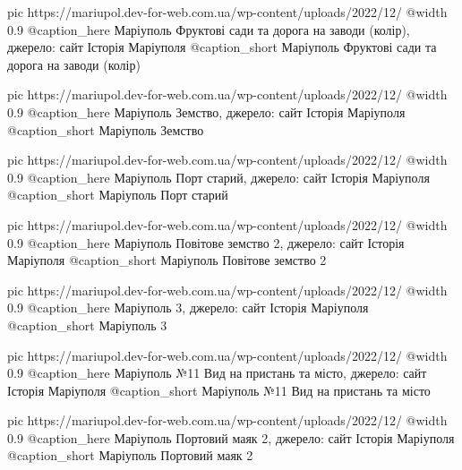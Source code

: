 	pic https://mariupol.dev-for-web.com.ua/wp-content/uploads/2022/12/%
	@width 0.9
	@caption_here Маріуполь Фруктові сади та дорога на заводи (колір), джерело: сайт Історія Маріуполя
	@caption_short Маріуполь Фруктові сади та дорога на заводи (колір)

	pic https://mariupol.dev-for-web.com.ua/wp-content/uploads/2022/12/%
	@width 0.9
	@caption_here Маріуполь Земство, джерело: сайт Історія Маріуполя
	@caption_short Маріуполь Земство

	pic https://mariupol.dev-for-web.com.ua/wp-content/uploads/2022/12/%
	@width 0.9
	@caption_here Маріуполь Порт старий, джерело: сайт Історія Маріуполя
	@caption_short Маріуполь Порт старий

	pic https://mariupol.dev-for-web.com.ua/wp-content/uploads/2022/12/%
	@width 0.9
	@caption_here Маріуполь Повітове земство 2, джерело: сайт Історія Маріуполя
	@caption_short Маріуполь Повітове земство 2

	pic https://mariupol.dev-for-web.com.ua/wp-content/uploads/2022/12/%
	@width 0.9
	@caption_here Маріуполь 3, джерело: сайт Історія Маріуполя
	@caption_short Маріуполь 3

	pic https://mariupol.dev-for-web.com.ua/wp-content/uploads/2022/12/%
	@width 0.9
	@caption_here Маріуполь №11 Вид на пристань та місто, джерело: сайт Історія Маріуполя
	@caption_short Маріуполь №11 Вид на пристань та місто

	pic https://mariupol.dev-for-web.com.ua/wp-content/uploads/2022/12/%
	@width 0.9
	@caption_here Маріуполь Портовий маяк 2, джерело: сайт Історія Маріуполя
	@caption_short Маріуполь Портовий маяк 2

